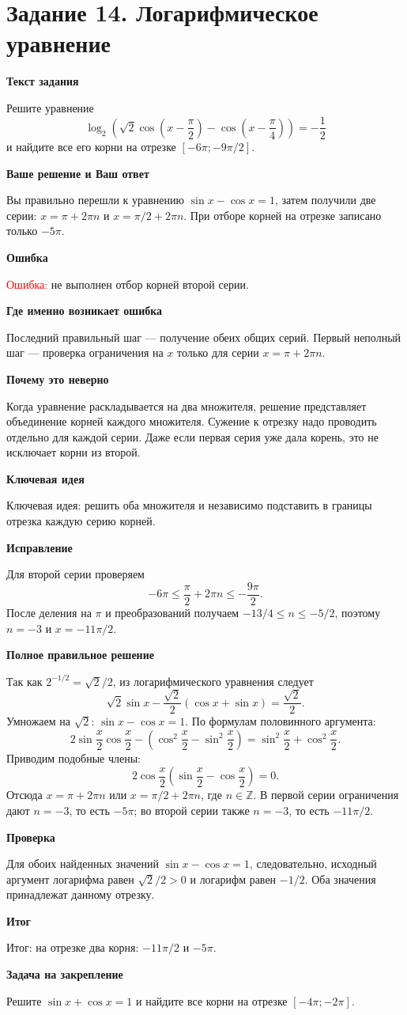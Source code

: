 \documentclass[11pt,a4paper]{article}
\newcommand{\Part}[1]{\par\medskip\noindent\textbf{#1}\par\smallskip}
\newcommand{\Task}[2]{\clearpage\phantomsection\label{task:#1}\section*{#2}}
\newcommand{\Err}[1]{\textcolor{red}{Ошибка:} #1}
\newcommand{\Idea}[1]{\textcolor{blue!60!black}{Ключевая идея:} #1}
\newcommand{\Result}[1]{\textcolor{teal!60!black}{Итог:} #1}
\begin{document}
\Task{v114l}{Задание 14. Логарифмическое уравнение}
\Part{Текст задания}
Решите уравнение
\[\log_2\!\left(\sqrt2\cos\left(x-\frac\pi2\right)-\cos\left(x-\frac\pi4\right)\right)=-\frac12\]
и найдите все его корни на отрезке $[-6\pi;-9\pi/2]$.
\Part{Ваше решение и Ваш ответ}
Вы правильно перешли к уравнению $\sin x-\cos x=1$, затем получили две серии: $x=\pi+2\pi n$ и $x=\pi/2+2\pi n$. При отборе корней на отрезке записано только $-5\pi$.
\Part{Ошибка}
\Err{не выполнен отбор корней второй серии.}
\Part{Где именно возникает ошибка}
Последний правильный шаг --- получение обеих общих серий. Первый неполный шаг --- проверка ограничения на $x$ только для серии $x=\pi+2\pi n$.
\Part{Почему это неверно}
Когда уравнение раскладывается на два множителя, решение представляет объединение корней каждого множителя. Сужение к отрезку надо проводить отдельно для каждой серии. Даже если первая серия уже дала корень, это не исключает корни из второй.
\Part{Ключевая идея}
\Idea{решить оба множителя и независимо подставить в границы отрезка каждую серию корней.}
\Part{Исправление}
Для второй серии проверяем
\[-6\pi\le\frac\pi2+2\pi n\le-\frac{9\pi}{2}.\]
После деления на $\pi$ и преобразований получаем $-13/4\le n\le-5/2$, поэтому $n=-3$ и $x=-11\pi/2$.
\Part{Полное правильное решение}
Так как $2^{-1/2}=\sqrt2/2$, из логарифмического уравнения следует
\[\sqrt2\sin x-\frac{\sqrt2}{2}(\cos x+\sin x)=\frac{\sqrt2}{2}.\]
Умножаем на $\sqrt2$: $\sin x-\cos x=1$. По формулам половинного аргумента:
\[2\sin\frac x2\cos\frac x2-\left(\cos^2\frac x2-\sin^2\frac x2\right)=\sin^2\frac x2+\cos^2\frac x2.\]
Приводим подобные члены:
\[2\cos\frac x2\left(\sin\frac x2-\cos\frac x2\right)=0.\]
Отсюда $x=\pi+2\pi n$ или $x=\pi/2+2\pi n$, где $n\in\mathbb Z$. В первой серии ограничения дают $n=-3$, то есть $-5\pi$; во второй серии также $n=-3$, то есть $-11\pi/2$.
\Part{Проверка}
Для обоих найденных значений $\sin x-\cos x=1$, следовательно, исходный аргумент логарифма равен $\sqrt2/2>0$ и логарифм равен $-1/2$. Оба значения принадлежат данному отрезку.
\Part{Итог}
\Result{на отрезке два корня: $-11\pi/2$ и $-5\pi$.}
\Part{Задача на закрепление}
Решите $\sin x+\cos x=1$ и найдите все корни на отрезке $[-4\pi;-2\pi]$.
\end{document}
